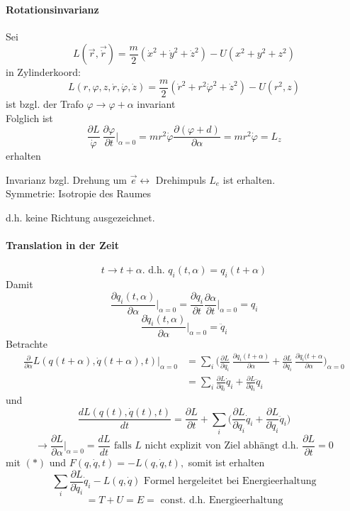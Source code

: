 \documentclass[titlepage,12pt,a4paper,ngerman]{report}
\newcommand{\tx}[1]{\textrm{#1}}
\newcommand{\rbox}[1]{\begin{tcolorbox}[colback=white,colframe=red!75!black]#1\end{tcolorbox}} %
\begin{document}
{\paragraph{Rotationsinvarianz}
Sei $$L(\vec{r}, \vec{\dot r}) = \frac{m}{2}(\dot x^2 + \dot y^2 + \dot z^2) - U(x^2+y^2+z^2)$$
in Zylinderkoord: $$L(r, \varphi, z, \dot r, \dot \varphi, \dot z) = \frac{m}{2}(\dot r^2 + r^2 \dot \varphi^2 + \dot z^2) - U(r^2, z)$$
ist bzgl. der Trafo $\varphi \rightarrow \varphi + \alpha$ invariant\\
Folglich ist $$\frac{\partial L}{\dot \varphi}\ \frac{\partial \varphi}{\partial t} \bigg|_{\alpha = 0} = mr^2\dot \varphi \frac{\partial (\varphi+d)}{\partial \alpha} = mr^2 \dot \varphi = L_z$$ erhalten
\rbox{Invarianz bzgl. Drehung um $\vec{e} \leftrightarrow$ Drehimpuls $L_e$ ist erhalten.\\
	Symmetrie: Isotropie des Raumes}
d.h. keine Richtung ausgezeichnet.

\paragraph{Translation in der Zeit}
$$t \rightarrow t + \alpha. \tx{ d.h. } q_i(t,\alpha) = q_i (t+\alpha)$$
Damit $$\frac{\partial q_i(t,\alpha)}{\partial \alpha} \bigg|_{\alpha = 0} = \frac{\partial q_i}{\partial t}\frac{\partial \alpha}{\partial t}\bigg|_{\alpha = 0} = q_i$$
$$\frac{\partial \dot q_i (t,\alpha)}{\partial \alpha}\bigg|_{\alpha = 0} = \ddot q_i$$
Betrachte 
\begin{align*}
\frac{\partial}{\partial \alpha} L (q(t +\alpha), \dot q (t+ \alpha),t)\bigg|_{\alpha = 0} &= \sum_i \bigg( \frac{\partial L}{\partial q_i}\ \frac{\partial q_i(t+\alpha)}{\partial \alpha} + \frac{\partial L}{\partial \dot q_i}\ \frac{\partial \dot q_i(t+\alpha}{\partial \alpha}\bigg)_{\alpha = 0}\\ 
&= \sum_i \frac{\partial L}{\partial q_i} \dot q_i +\frac{\partial L}{\partial\dot q_i} \ddot q_i
\end{align*}
und $$\frac{dL(q(t),\dot q (t), t)}{dt} = \frac{\partial L}{\partial t} + \sum_i \bigg( \frac{\partial L}{\partial q_i} \dot q_i + \frac{\partial L}{\partial \dot q_i} \ddot q_i \bigg)$$
$$\rightarrow \frac{\partial L }{\partial \alpha}\bigg|_{\alpha = 0} = \frac{d L}{dt} \tx{ falls $L$ nicht explizit von Ziel abhängt d.h. } \frac{\partial L}{\partial t} = 0$$ 
mit $(*)$ und $F(q, \dot q, t) = -L (q, \dot q,t),$ somit ist erhalten
$$\sum_i \frac{\partial L}{\partial \dot q_i}\dot q_i - L (q, \dot q) \tx{ Formel hergeleitet bei Energieerhaltung}$$
$$= T + U = E = \tx{ const. d.h. Energieerhaltung}$$

}
\end{document}

